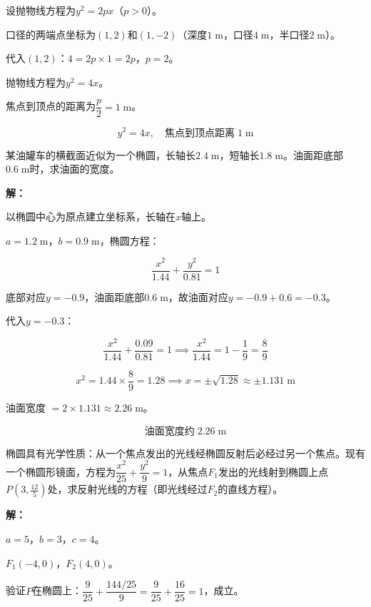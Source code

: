 \documentclass[12pt, a4paper]{ctexart}
\begin{document}
设抛物线方程为$y^2 = 2px$（$p > 0$）。

口径的两端点坐标为$(1, 2)$和$(1, -2)$（深度$1\;\text{m}$，口径$4\;\text{m}$，半口径$2\;\text{m}$）。

代入$(1, 2)$：$4 = 2p \times 1 = 2p$，$p = 2$。

抛物线方程为$y^2 = 4x$。

焦点到顶点的距离为$\dfrac{p}{2} = 1\;\text{m}$。

$$\boxed{y^2 = 4x, \quad \text{焦点到顶点距离}\; 1\;\text{m}}$$

\begin{appbox}[【应用3】油罐车横截面问题]
某油罐车的横截面近似为一个椭圆，长轴长$2.4\;\text{m}$，短轴长$1.8\;\text{m}$。油面距底部$0.6\;\text{m}$时，求油面的宽度。
\end{appbox}

\textbf{解：}

以椭圆中心为原点建立坐标系，长轴在$x$轴上。

$a = 1.2\;\text{m}$，$b = 0.9\;\text{m}$，椭圆方程：

$$\frac{x^2}{1.44} + \frac{y^2}{0.81} = 1$$

底部对应$y = -0.9$，油面距底部$0.6\;\text{m}$，故油面对应$y = -0.9 + 0.6 = -0.3$。

代入$y = -0.3$：

$$\frac{x^2}{1.44} + \frac{0.09}{0.81} = 1 \implies \frac{x^2}{1.44} = 1 - \frac{1}{9} = \frac{8}{9}$$

$$x^2 = 1.44 \times \frac{8}{9} = 1.28 \implies x = \pm\sqrt{1.28} \approx \pm 1.131\;\text{m}$$

油面宽度 $= 2 \times 1.131 \approx 2.26\;\text{m}$。

$$\boxed{\text{油面宽度约}\; 2.26\;\text{m}}$$

\begin{appbox}
椭圆具有光学性质：从一个焦点发出的光线经椭圆反射后必经过另一个焦点。现有一个椭圆形镜面，方程为$\dfrac{x^2}{25} + \dfrac{y^2}{9} = 1$，从焦点$F_1$发出的光线射到椭圆上点$P(3, \frac{12}{5})$处，求反射光线的方程（即光线经过$F_2$的直线方程）。
\end{appbox}

\textbf{解：}

$a = 5$，$b = 3$，$c = 4$。

$F_1(-4, 0)$，$F_2(4, 0)$。

验证$P$在椭圆上：$\dfrac{9}{25} + \dfrac{144/25}{9} = \dfrac{9}{25} + \dfrac{16}{25} = 1$，成立。
\end{document}
